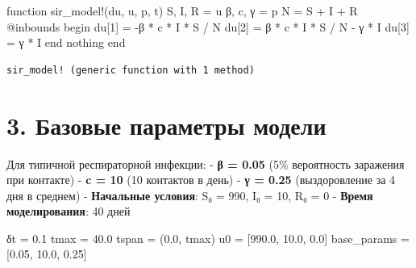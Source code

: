 \documentclass[
  12pt,
  a4paper,
  DIV=11,
  numbers=noendperiod]{scrreprt}
\newenvironment{Shaded}{\begin{snugshade}}{\end{snugshade}}
\newcommand{\ConstantTok}[1]{\textcolor[rgb]{0.56,0.35,0.01}{#1}}
\newcommand{\ControlFlowTok}[1]{\textcolor[rgb]{0.00,0.23,0.31}{#1}}
\newcommand{\FloatTok}[1]{\textcolor[rgb]{0.68,0.00,0.00}{#1}}
\newcommand{\FunctionTok}[1]{\textcolor[rgb]{0.28,0.35,0.67}{#1}}
\newcommand{\KeywordTok}[1]{\textcolor[rgb]{0.00,0.23,0.31}{#1}}
\newcommand{\NormalTok}[1]{\textcolor[rgb]{0.00,0.23,0.31}{#1}}
\newcommand{\OperatorTok}[1]{\textcolor[rgb]{0.37,0.37,0.37}{#1}}
\newcommand{\PreprocessorTok}[1]{\textcolor[rgb]{0.68,0.00,0.00}{#1}}
\begin{document}
\begin{Shaded}
\begin{Highlighting}[]
\KeywordTok{function} \FunctionTok{sir\_model!}\NormalTok{(du, u, p, t)}
\NormalTok{    S, I, R }\OperatorTok{=}\NormalTok{ u}
\NormalTok{    β, c, γ }\OperatorTok{=}\NormalTok{ p}
\NormalTok{    N }\OperatorTok{=}\NormalTok{ S }\OperatorTok{+}\NormalTok{ I }\OperatorTok{+}\NormalTok{ R}
    \PreprocessorTok{@inbounds} \ControlFlowTok{begin}
\NormalTok{        du[}\FloatTok{1}\NormalTok{] }\OperatorTok{=} \OperatorTok{{-}}\NormalTok{β }\OperatorTok{*}\NormalTok{ c }\OperatorTok{*}\NormalTok{ I }\OperatorTok{*}\NormalTok{ S }\OperatorTok{/}\NormalTok{ N}
\NormalTok{        du[}\FloatTok{2}\NormalTok{] }\OperatorTok{=}\NormalTok{ β }\OperatorTok{*}\NormalTok{ c }\OperatorTok{*}\NormalTok{ I }\OperatorTok{*}\NormalTok{ S }\OperatorTok{/}\NormalTok{ N }\OperatorTok{{-}}\NormalTok{ γ }\OperatorTok{*}\NormalTok{ I}
\NormalTok{        du[}\FloatTok{3}\NormalTok{] }\OperatorTok{=}\NormalTok{ γ }\OperatorTok{*}\NormalTok{ I}
    \ControlFlowTok{end}
    \ConstantTok{nothing}
\KeywordTok{end}
\end{Highlighting}
\end{Shaded}

\begin{verbatim}
sir_model! (generic function with 1 method)
\end{verbatim}

\section{3. Базовые параметры
модели}\label{ux431ux430ux437ux43eux432ux44bux435-ux43fux430ux440ux430ux43cux435ux442ux440ux44b-ux43cux43eux434ux435ux43bux438}

Для типичной респираторной инфекции: - \textbf{β = 0.05} (5\%
вероятность заражения при контакте) - \textbf{c = 10} (10 контактов в
день) - \textbf{γ = 0.25} (выздоровление за 4 дня в среднем) -
\textbf{Начальные условия}: S₀ = 990, I₀ = 10, R₀ = 0 - \textbf{Время
моделирования}: 40 дней

\begin{Shaded}
\begin{Highlighting}[]
\NormalTok{δt }\OperatorTok{=} \FloatTok{0.1}
\NormalTok{tmax }\OperatorTok{=} \FloatTok{40.0}
\NormalTok{tspan }\OperatorTok{=}\NormalTok{ (}\FloatTok{0.0}\NormalTok{, tmax)}
\NormalTok{u0 }\OperatorTok{=}\NormalTok{ [}\FloatTok{990.0}\NormalTok{, }\FloatTok{10.0}\NormalTok{, }\FloatTok{0.0}\NormalTok{]}
\NormalTok{base\_params }\OperatorTok{=}\NormalTok{ [}\FloatTok{0.05}\NormalTok{, }\FloatTok{10.0}\NormalTok{, }\FloatTok{0.25}\NormalTok{]}
\end{Highlighting}
\end{Shaded}
\end{document}
